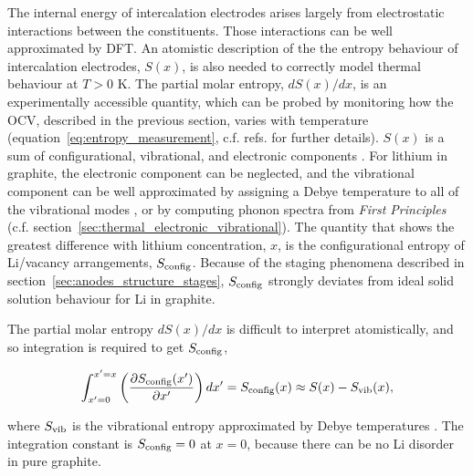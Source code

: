 \documentclass[../main.tex]{subfiles}
\begin{document}
The internal energy of intercalation electrodes arises largely from electrostatic interactions between the constituents. Those interactions can be well approximated by DFT. An atomistic description of the the entropy behaviour of intercalation electrodes, $S(x)$, is also needed to correctly model thermal behaviour at $T>0$ K. The partial molar entropy, $dS(x)/dx$, is an experimentally accessible quantity, which can be probed by monitoring how the OCV, described in the previous section, varies with temperature (equation~\ref{eq:entropy_measurement}, c.f. refs.  for further details). $S(x)$ is a sum of configurational, vibrational, and electronic components \cite{REYNIER2003850,Reynier2004}. For lithium in graphite, the electronic component can be neglected, and the vibrational component can be well approximated by assigning a Debye temperature to all of the vibrational modes \cite{REYNIER2003850,Reynier2004}, or by computing phonon spectra from \textit{First Principles} \cite{hazrati_li_2014,vanderven2018} (c.f. section~\ref{sec:thermal_electronic_vibrational}). The quantity that shows the greatest difference with lithium concentration, $x$, is the configurational entropy of Li/vacancy arrangements, $S_{\rm{config}}$. Because of the staging phenomena described in section~\ref{sec:anodes_structure_stages}, $S_{\rm{config}}$ strongly deviates from ideal solid solution behaviour for Li in graphite.

The partial molar entropy $dS(x)/dx$ is difficult to interpret atomistically, and so integration is required to get $S_{\rm{config}}$,

\begin{equation}
    \int_{x'=0}^{x'=x} \left(\frac{{\partial}S_{\rm{config}}(x')}{{\partial}x'}\right)dx' = S_{\rm{config}}(x) \approx S(x) - S_{\rm{vib}}(x),
    \label{eq:entropy_integration}
\end{equation}

where $S_{\rm{vib}}$ is the vibrational entropy approximated by Debye temperatures  \cite{REYNIER2003850,Reynier2004}. The integration constant is $S_{\rm{config}} = 0$ at $x=0$, because there can be no Li disorder in pure graphite. 
\end{document}
